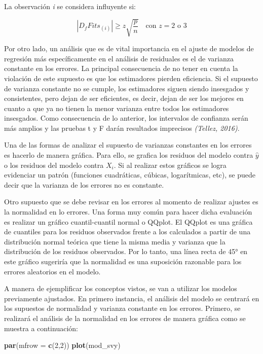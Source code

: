 \documentclass[
  12pt,
]{book}
\newenvironment{Shaded}{\begin{snugshade}}{\end{snugshade}}
\newcommand{\AttributeTok}[1]{\textcolor[rgb]{0.13,0.29,0.53}{#1}}
\newcommand{\DecValTok}[1]{\textcolor[rgb]{0.00,0.00,0.81}{#1}}
\newcommand{\FunctionTok}[1]{\textcolor[rgb]{0.13,0.29,0.53}{\textbf{#1}}}
\newcommand{\NormalTok}[1]{#1}
\begin{document}
La observación \emph{i} se considera influyente si:

\[
|D_f Fits_{(i)}| \geq z\sqrt{\frac{p}{n}} \quad \text{con } z=2 \text{ o } 3
\]

Por otro lado, un análisis que es de vital importancia en el ajuste de modelos de regresión más específicamente en el análisis de residuales es el de varianza constante en los errores. La principal consecuencia de no tener en cuenta la violación de este supuesto es que los estimadores pierden eficiencia. Si el supuesto de varianza constante no se cumple, los estimadores siguen siendo insesgados y consistentes, pero dejan de ser eficientes, es decir, dejan de ser los mejores en cuanto a que ya no tienen la menor varianza entre todos los estimadores insesgados. Como consecuencia de lo anterior, los intervalos de confianza serán más amplios y las pruebas t y F darán resultados imprecisos \emph{(Tellez, 2016)}.

Una de las formas de analizar el supuesto de varianzas constantes en los errores es hacerlo de manera gráfica. Para ello, se grafica los residuos del modelo contra \(\hat{y}\) o los residuos del modelo contra \(X_{i}\). Si al realizar estos gráficos se logra evidenciar un patrón (funciones cuadráticas, cúbicas, logarítmicas, etc), se puede decir que la varianza de los errores no es constante.

Otro supuesto que se debe revisar en los errores al momento de realizar ajustes es la normalidad en lo errores. Una forma muy común para hacer dicha evaluación es realizar un gráfico cuantil-cuantil normal o QQplot. El QQplot es una gráfica de cuantiles para los residuos observados frente a los calculados a partir de una distribución normal teórica que tiene la misma media y varianza que la distribución de los residuos observados. Por lo tanto, una línea recta de 45° en este gráfico sugeriría que la normalidad es una suposición razonable para los errores aleatorios en el modelo.

A manera de ejemplificar los conceptos vistos, se van a utilizar los modelos previamente ajustados. En primero instancia, el análisis del modelo se centrará en los supuestos de normalidad y varianza constante en los errores. Primero, se realizará el análisis de la normalidad en los errores de manera gráfica como se muestra a continuación:

\begin{Shaded}
\begin{Highlighting}[]
\FunctionTok{par}\NormalTok{(}\AttributeTok{mfrow =} \FunctionTok{c}\NormalTok{(}\DecValTok{2}\NormalTok{,}\DecValTok{2}\NormalTok{))}
\FunctionTok{plot}\NormalTok{(mod\_svy)}
\end{Highlighting}
\end{Shaded}
\end{document}
